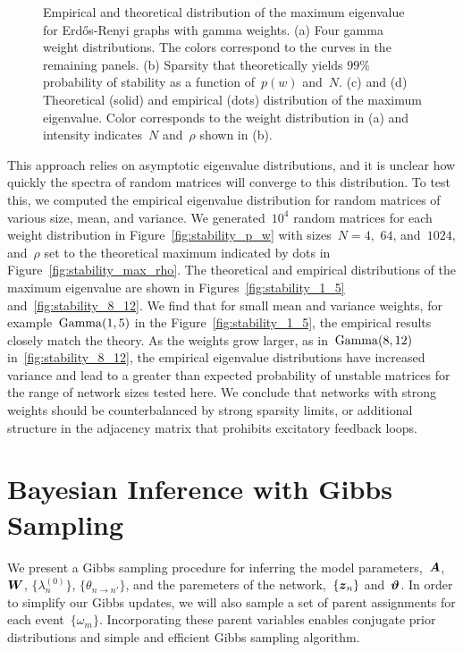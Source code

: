 \begin{figure}[t]
\begin{center}
\begin{subfigure}[b]{.22\textwidth}
\end{subfigure}
\end{center}
\vspace{-1em}
\caption[Distribution of the maximum eigenvalue for Erd\H{o}s-Renyi
  graphs with gamma weights]{Empirical and theoretical distribution of
  the maximum eigenvalue for Erd\H{o}s-Renyi graphs with gamma
  weights. (a) Four gamma weight distributions. The colors correspond
  to the curves in the remaining panels. (b) Sparsity that
  theoretically yields ${99\%}$ probability of stability as a function
  of~${p(w)}$ and~$N$. (c) and (d) Theoretical (solid) and empirical
  (dots) distribution of the maximum eigenvalue. Color corresponds to
  the weight distribution in (a) and intensity indicates~$N$
  and~$\rho$ shown in (b).}
\label{fig:stability}
\end{figure}

 
This approach relies on asymptotic eigenvalue distributions, and it is
unclear how quickly the spectra of random matrices will converge to
this distribution. To test this, we computed the empirical eigenvalue
distribution for random matrices of various size, mean, and
variance. We generated~$10^4$ random matrices for each weight
distribution in Figure~\ref{fig:stability_p_w} with sizes~$N=4$,~$64$,
and~$1024$, and~$\rho$ set to the theoretical maximum indicated by
dots in Figure~\ref{fig:stability_max_rho}. The theoretical and
empirical distributions of the maximum eigenvalue are shown in
Figures~\ref{fig:stability_1_5} and~\ref{fig:stability_8_12}. We find
that for small mean and variance weights, for
example~$\mathrm{Gamma}(1,5)$ in the Figure~\ref{fig:stability_1_5}, the
empirical results closely match the theory. As the weights grow
larger, as in~${\mathrm{Gamma}(8,12)}$ in~\ref{fig:stability_8_12}, the
empirical eigenvalue distributions have increased variance and lead to
a greater than expected probability of unstable matrices for the range
of network sizes tested here. We conclude that networks with strong
weights should be counterbalanced by strong sparsity limits, or
additional structure in the adjacency matrix that prohibits excitatory
feedback loops.


\section{Bayesian Inference with Gibbs Sampling}
\label{sec:hawkes_inference}
We present a Gibbs sampling procedure for inferring the model
parameters,~$\boldsymbol{A}$,~$\boldsymbol{W}$, $\{\lambda^{(0)}_{n}\}$, $\{\theta_{n \to n'}\}$,
and the paremeters of the network,~$\{\boldsymbol{z}_n\}$ and~$\boldsymbol{\vartheta}$.
In order to simplify our Gibbs updates, we
will also sample a set of parent assignments for each
event~$\{\omega_m\}$. Incorporating these parent variables enables
conjugate prior distributions and simple and efficient Gibbs sampling
algorithm.

